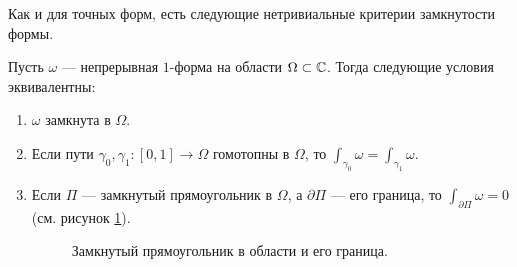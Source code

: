 Как и для точных форм, есть следующие нетривиальные критерии замкнутости формы.

\begin{thm}
 \label{theorem:closed_1_form}
 Пусть $\omega$ --- непрерывная $1$-форма на области $\Omega \subset \mathbb{C}$. Тогда следующие условия эквивалентны:
 \begin{enumerate}
  \item \label{enum1:theorem:closed_1_form} $\omega$ замкнута в $\Omega$.
  \item \label{enum2:theorem:closed_1_form} Если пути $\gamma_0, \gamma_1 \colon [0,1] \to \Omega$ гомотопны в $\Omega$, то $\int_{\gamma_0} \omega = \int_{\gamma_1} \omega $.
  \item \label{enum3:theorem:closed_1_form} Если $\Pi$ --- замкнутый прямоугольник в $\Omega$, а $\partial \Pi$ --- его граница, то $\int_{\partial \Pi} \omega = 0$ (см. рисунок \ref{fig:closed-rectangle-and-its-border}).
   \begin{figure}[ht]
    \centering
    \caption{Замкнутый прямоугольник в области и его граница.}
    \label{fig:closed-rectangle-and-its-border}
   \end{figure}
 \end{enumerate}
\end{thm}
